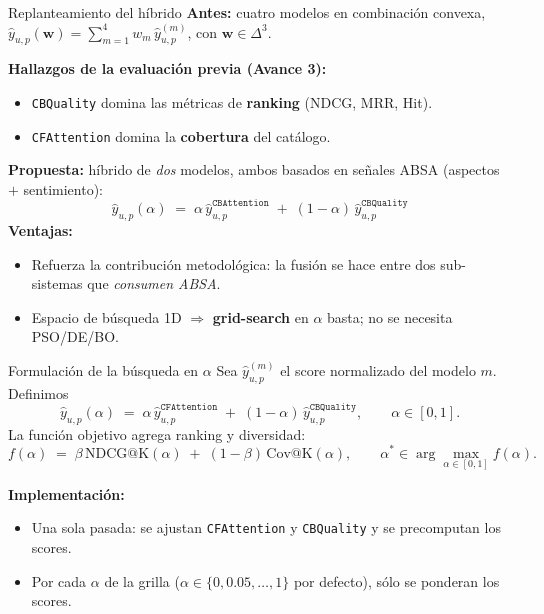 \documentclass[aspectratio=169,11pt]{beamer}
\begin{document}
\begin{frame}{Replanteamiento del h\'ibrido}
	\small
	\textbf{Antes:} cuatro modelos en combinaci\'on convexa,
	$\hat y_{u,p}(\mathbf{w}) = \sum_{m=1}^{4} w_m \,\hat y^{(m)}_{u,p}$, con $\mathbf{w}\in\Delta^{3}$.

	\vspace{0.4em}
	\textbf{Hallazgos de la evaluaci\'on previa (Avance 3):}
	\begin{itemize}\setlength\itemsep{2pt}
		\item {\tt CBQuality} domina las m\'etricas de \textbf{ranking} (NDCG, MRR, Hit).
		\item {\tt CFAttention} domina la \textbf{cobertura} del cat\'alogo.
	\end{itemize}

	\vspace{0.5em}
	\textbf{Propuesta:} h\'ibrido de \emph{dos} modelos, ambos basados en se\~nales ABSA (aspectos $+$ sentimiento):
	\[
		\boxed{\;\hat y_{u,p}(\alpha) \;=\; \alpha\,\hat y^{\mathtt{CBAttention}}_{u,p} \;+\; (1-\alpha)\,\hat y^{\mathtt{CBQuality}}_{u,p}\;}
	\]
	\textbf{Ventajas:}
	\begin{itemize}\setlength\itemsep{2pt}
		\item Refuerza la contribuci\'on metodol\'ogica: la fusi\'on se hace entre dos sub-sistemas que \emph{consumen ABSA}.
		\item Espacio de b\'usqueda 1D $\Rightarrow$ \textbf{grid-search} en $\alpha$ basta; no se necesita PSO/DE/BO.
	\end{itemize}
\end{frame}

\begin{frame}{Formulaci\'on de la b\'usqueda en $\alpha$}
	\small
	Sea $\hat y^{(m)}_{u,p}$ el score normalizado del modelo $m$. Definimos
	\[
		\hat y_{u,p}(\alpha) \;=\; \alpha\,\hat y^{\mathtt{CFAttention}}_{u,p} \;+\; (1-\alpha)\,\hat y^{\mathtt{CBQuality}}_{u,p},
		\qquad \alpha \in [0,1].
	\]
	La funci\'on objetivo agrega ranking y diversidad:
	\[
		f(\alpha)\;=\;\beta\,\mathrm{NDCG@K}(\alpha)\;+\;(1-\beta)\,\mathrm{Cov@K}(\alpha),
		\qquad
		\alpha^{\!*} \in \arg\max_{\alpha\in[0,1]} f(\alpha).
	\]

	\textbf{Implementaci\'on:}
	\begin{itemize}\setlength\itemsep{2pt}
		\item Una sola pasada: se ajustan {\tt CFAttention} y {\tt CBQuality} y se precomputan los scores.
		\item Por cada $\alpha$ de la grilla ($\alpha\!\in\!\{0, 0.05, \dots, 1\}$ por defecto), s\'olo se ponderan los scores.
	\end{itemize}
\end{frame}
\end{document}
